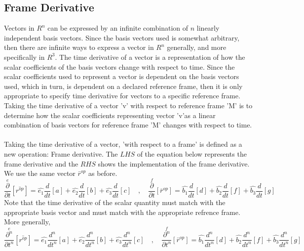 \documentclass[a4paper, 12pt]{report}
\begin{document}
\begin{center}
\section{Frame Derivative}
\begin{comment}
\end{comment}
Vectors in $R^{n}$ can be expressed by an infinite combination of $n$ linearly independent basis vectors. Since the basis vectors used is somewhat arbitrary, then there are infinite ways to express a vector in $R^{n}$ generally, and more specifically in $R^{3}$. The time derivative of a vector is a representation of how the scalar coefficients of the basis vectors change with respect to time. Since the scalar coefficients used to represent a vector is dependent on the basis vectors used, which in turn, is dependent on a declared reference frame, then it is only appropriate to specify time derivative for vectors to a specific reference frame. Taking the time derivative of a vector 'v' with respect to reference frame 'M' is to determine how the scalar coefficients representing vector 'v'as a linear combination of basis vectors for reference frame 'M' changes with respect to time.
\\~\\Taking the time derivative of a vector, 'with respect to a frame' is defined as a new operation: Frame derivative. The $LHS$ of the equation below represents the frame derivative and the $RHS$ shows the implementation of the frame derivative. We use the same vector $\bar{r}^{op}$ as before.
$$\overset{e}{\frac{\partial}{\partial t}}[\bar{{r}^{op}}] = \hat{e_{1}}\frac{d}{d t}[a] + \hat{e_{2}}\frac{d}{d t}[b] + \hat{e_{3}}\frac{d}{d t}[c] \quad,\quad \overset{f}{\frac{\partial}{\partial t}}[\bar{r}^{op}] = \hat{b_{1}}\frac{d}{d t}[d] + \hat{b_{2}}\frac{d}{d t}[f] + \hat{b_{3}}\frac{d}{d t}[g]$$
Note that the time derivative of the scalar quantity must match with the appropriate basis vector and must match with the appropriate refrence frame. More generally,
$$\overset{e}{\frac{\partial^n}{\partial t^n}}[\bar{{r}^{op}}] = \hat{e_{1}}\frac{d^n}{d t^n}[a] + \hat{e_{2}}\frac{d^n}{d t^n}[b] + \hat{e_{3}}\frac{d^n}{d t^n}[c] \quad,\quad \overset{f}{\frac{\partial^n}{\partial t^n}}[\bar{r}^{op}] = \hat{b_{1}}\frac{d^n}{d t^n}[d] + \hat{b_{2}}\frac{d^n}{d t^n}[f] + \hat{b_{3}}\frac{d^n}{d t^n}[g]$$





\end{center}
\end{document}

